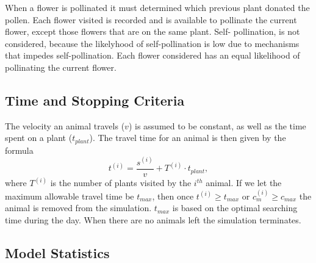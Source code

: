   When a flower is pollinated it must determined which previous plant donated the pollen. Each
  flower visited is recorded and is available to pollinate the current flower, except those flowers
  that are on the same plant. Self- pollination, is not considered, because the likelyhood of
  self-pollination is low due to mechanisms that impedes self-pollination. Each flower considered
  has an equal likelihood of pollinating the current flower.

\subsection{Time and Stopping Criteria}
  The velocity an animal travels ($v$) is assumed to be constant, as well as the time spent on a
  plant ($t_{plant}$).  The travel time for an animal is then given by the formula
  \[
    t^{\left(i\right)} = \frac{s^{\left(i\right)}}{v} + T^{\left(i\right)} \cdot t_{plant},
  \]
  where $T^{\left(i\right)}$ is the number of plants visited by the $i^{th}$ animal. If we let the
  maximum allowable travel time be $t_{max}$, then once $t^{\left(i\right)} \geq t_{max}$ or
  $c^{\left(i\right)}_m \geq c_{max}$ the animal is removed from the simulation. $t_{max}$ is based
  on the optimal searching time during the day.  When there are no animals left the simulation
  terminates.

\subsection{Model Statistics}

